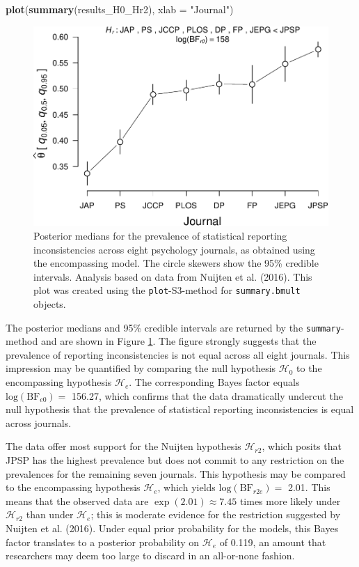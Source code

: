 \documentclass[
  english,
  man,floatsintext]{apa6}
\newenvironment{Shaded}{\begin{snugshade}}{\end{snugshade}}
\newcommand{\DataTypeTok}[1]{\textcolor[rgb]{0.13,0.29,0.53}{#1}}
\newcommand{\KeywordTok}[1]{\textcolor[rgb]{0.13,0.29,0.53}{\textbf{#1}}}
\newcommand{\NormalTok}[1]{#1}
\newcommand{\StringTok}[1]{\textcolor[rgb]{0.31,0.60,0.02}{#1}}
\begin{document}
\begin{Shaded}
\begin{Highlighting}[]
\KeywordTok{plot}\NormalTok{(}\KeywordTok{summary}\NormalTok{(results_H0_Hr2), }\DataTypeTok{xlab =} \StringTok{"Journal"}\NormalTok{)}
\end{Highlighting}
\end{Shaded}

\begin{figure}
\centering
\includegraphics{Rpackage_paper_files/figure-latex/journals-1.pdf}
\caption{\label{fig:journals}Posterior medians for the prevalence of statistical reporting inconsistencies across eight psychology journals, as obtained using the encompassing model. The circle skewers show the 95\% credible intervals. Analysis based on data from Nuijten et al. (2016). This plot was created using the \texttt{plot}-S3-method for \texttt{summary.bmult} objects.}
\end{figure}

The posterior medians and 95\% credible intervals are returned by the \texttt{summary}-method and are shown in Figure \ref{fig:journals}. The figure strongly suggests that the prevalence of reporting inconsistencies is not equal across all eight journals. This impression may be quantified by comparing the null hypothesis \(\mathcal{H}_0\) to the encompassing hypothesis \(\mathcal{H}_e\). The corresponding Bayes factor equals \(\text{log}(\text{BF}_{e0}) =\) 156.27, which confirms that the data dramatically undercut the null hypothesis that the prevalence of statistical reporting inconsistencies is equal across journals.

The data offer most support for the Nuijten hypothesis \(\mathcal{H}_{r2}\), which posits that JPSP has the highest prevalence but does not commit to any restriction on the prevalences for the remaining seven journals. This hypothesis may be compared to the encompassing hypothesis \(\mathcal{H}_e\), which yields \(\text{log}(\text{BF}_{r2e}) =\) 2.01. This means that the observed data are \(\exp(2.01) \approx 7.45\) times more likely under \(\mathcal{H}_{r2}\) than under \(\mathcal{H}_e\); this is moderate evidence for the restriction suggested by Nuijten et al. (2016). Under equal prior probability for the models, this Bayes factor translates to a posterior probability on \(\mathcal{H}_e\) of 0.119, an amount that researchers may deem too large to discard in an all-or-none fashion.
\end{document}
